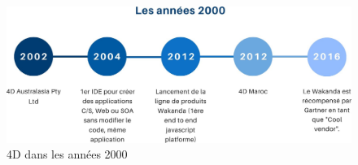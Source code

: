 \begin{figure}[h]
    \centering
    \includegraphics[scale=0.3]{Images/20.jpg} %
    \caption{4D dans les années 2000}
    \label{fig:Histoire90}
\end{figure}


\vspace{3cm}




